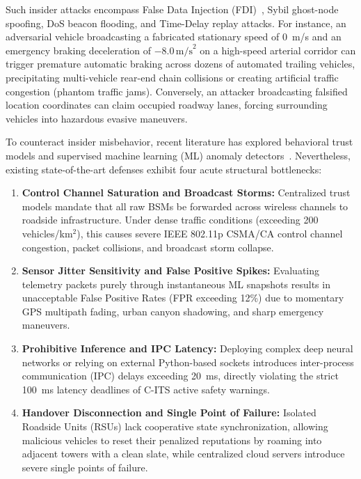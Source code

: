 \documentclass[conference]{IEEEtran}
\begin{document}
Such insider attacks encompass False Data Injection (FDI)~\cite{veremi}, Sybil ghost-node spoofing, DoS beacon flooding, and Time-Delay replay attacks. For instance, an adversarial vehicle broadcasting a fabricated stationary speed of 0~m/s and an emergency braking deceleration of $-8.0\,\text{m/s}^2$ on a high-speed arterial corridor can trigger premature automatic braking across dozens of automated trailing vehicles, precipitating multi-vehicle rear-end chain collisions or creating artificial traffic congestion (phantom traffic jams). Conversely, an attacker broadcasting falsified location coordinates can claim occupied roadway lanes, forcing surrounding vehicles into hazardous evasive maneuvers.

To counteract insider misbehavior, recent literature has explored behavioral trust models and supervised machine learning (ML) anomaly detectors~\cite{ahmad2019trust, so2018verifying}. Nevertheless, existing state-of-the-art defenses exhibit four acute structural bottlenecks:
\begin{enumerate}
    \item \textbf{Control Channel Saturation and Broadcast Storms:} Centralized trust models mandate that all raw BSMs be forwarded across wireless channels to roadside infrastructure. Under dense traffic conditions (exceeding 200 vehicles/km$^2$), this causes severe IEEE 802.11p CSMA/CA control channel congestion, packet collisions, and broadcast storm collapse.
    \item \textbf{Sensor Jitter Sensitivity and False Positive Spikes:} Evaluating telemetry packets purely through instantaneous ML snapshots results in unacceptable False Positive Rates (FPR exceeding 12\%) due to momentary GPS multipath fading, urban canyon shadowing, and sharp emergency maneuvers.
    \item \textbf{Prohibitive Inference and IPC Latency:} Deploying complex deep neural networks or relying on external Python-based sockets introduces inter-process communication (IPC) delays exceeding 20~ms, directly violating the strict 100~ms latency deadlines of C-ITS active safety warnings.
    \item \textbf{Handover Disconnection and Single Point of Failure:} Isolated Roadside Units (RSUs) lack cooperative state synchronization, allowing malicious vehicles to reset their penalized reputations by roaming into adjacent towers with a clean slate, while centralized cloud servers introduce severe single points of failure.
\end{enumerate}
\end{document}
